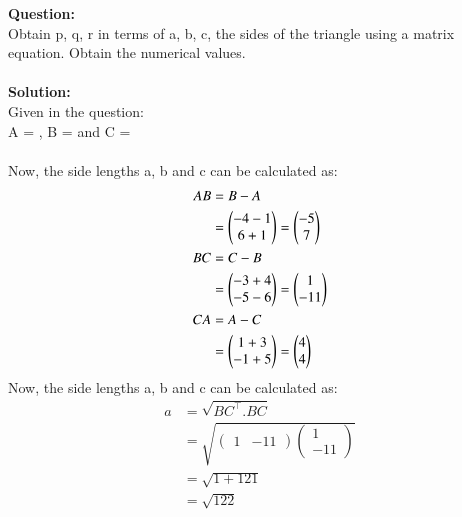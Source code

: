 \documentclass[journal,12pt,twocolumn]{IEEEtran}
\theoremstyle{remark}
\begin{document}
%
\textbf{Question:}\\
Obtain p, q, r in terms of a, b, c, the sides of the triangle using a matrix
equation. Obtain the numerical values.\\\\
\indent\textbf{Solution:}\\
Given in the question:\\ 
A = ,
B = 
and C =  \\\\
Now, the side lengths a, b and c can be calculated as:
\begin{align}
    AB &= B-A\\
    &=\begin{pmatrix} -4-1 \\ 6+1 \end{pmatrix} = \begin{pmatrix} -5\\7 \end{pmatrix}\\
    BC &= C-B \\
    &=\begin{pmatrix}-3+4 \\ -5-6 \end{pmatrix} = \begin{pmatrix} 1\\-11\end{pmatrix}\\
    CA &= A-C\\ 
    &=\begin{pmatrix} 1+3 \\ -1+5 \end{pmatrix} = \begin{pmatrix} 4\\4 \end{pmatrix}
\end{align}
Now, the side lengths a, b and c can be calculated as:
\begin{align}
    a &= \sqrt{BC^{\top}.BC}\\
    &= \sqrt{\begin{pmatrix} 1&-11 \end{pmatrix} \begin{pmatrix} 1\\-11 \end{pmatrix}}\\
    &= \sqrt{1+121}\\
    &=\sqrt{122}
\end{align}
\end{document}
